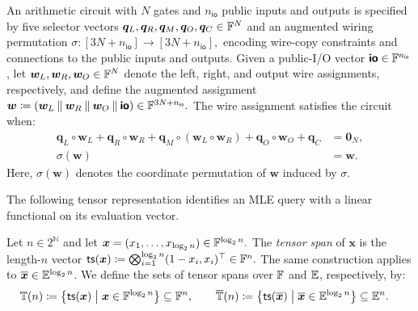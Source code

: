 \begin{definition}
\label{def:plonk}
An arithmetic circuit with \(N\) gates and \(n_{\mathsf{io}}\)
public inputs and outputs is specified by five selector vectors
\(
    \bm q_L,\bm q_R,\bm q_M,\bm q_O,\bm q_C
    \in{\mathbb{F}}^N
\)
and an augmented wiring permutation
\(
    \sigma:
    [3N+n_{\mathsf{io}}]
    \to
    [3N+n_{\mathsf{io}}],
\)
encoding wire-copy constraints and connections to the public inputs
and outputs.
Given a public-I/O vector
\(\bm{\mathsf{io}}\in{\mathbb{F}}^{n_{\mathsf{io}}}\), let
\(\bm w_L,\bm w_R,\bm w_O\in{\mathbb{F}}^N\) denote the left, right,
and output wire assignments, respectively, and define the
augmented assignment
\(
    \bm w
    \coloneqq
    (\bm w_L\mathbin{\|}\bm w_R\mathbin{\|}\bm w_O
    \mathbin{\|}\bm{\mathsf{io}})
    \in{\mathbb{F}}^{3N+n_{\mathsf{io}}}.
\)
The wire assignment satisfies the circuit when:
\begin{align}
    \bm q_L\circ\bm w_L
    +\bm q_R\circ\bm w_R
    +\bm q_M\circ(\bm w_L\circ\bm w_R)
    +\bm q_O\circ\bm w_O
    +\bm q_C
    &=\bm 0_N,
    \label{eq:plonk1}\\
    \sigma(\bm w)
    &=\bm w.
    \label{eq:plonk2}
\end{align}
Here,
\(\sigma(\bm w)\) denotes the coordinate permutation of
\(\bm w\) induced by \(\sigma\).
\end{definition}


The following tensor representation identifies an MLE query with a
linear functional on its evaluation vector.

\begin{definition}
\label{def:tensorspan}
Let \(n \in 2^\mathbb{N}\) and let
\(
    \bm x
    =
    (x_1,\ldots,x_{\log_2 n})
    \in{\mathbb{F}}^{\log_2 n}.
\)
The \emph{tensor span} of \(\bm x\) is the length-\(n\) vector
\(
    {\sf ts}(\bm x)
    \coloneqq
    \bigotimes_{i=1}^{\log_2 n} (1-x_i, x_i)^\top
    \in{\mathbb{F}}^n.
\)
The same construction applies to
\(\overline{\bm x}\in\mathbb{E}^{\log_2 n}\).
We define the sets of tensor spans over \({\mathbb{F}}\) and
\(\mathbb{E}\), respectively, by:
\begin{align*}
    \mathbb{T}(n)
    &\coloneqq
    \left\{
        {\sf ts}(\bm x)
        \;\middle|\;
        \bm x\in{\mathbb{F}}^{\log_2 n}
    \right\}
    \subseteq{\mathbb{F}}^n,
    \qquad
    \overline{\mathbb{T}}(n)
    \coloneqq
    \left\{
        {\sf ts}(\overline{\bm x})
        \;\middle|\;
        \overline{\bm x}\in\mathbb{E}^{\log_2 n}
    \right\}
    \subseteq\mathbb{E}^n.
\end{align*}
\end{definition}

